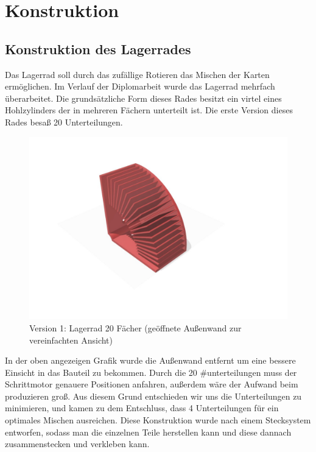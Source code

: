 \pagebreak
\section{Konstruktion}
\subsection{Konstruktion des Lagerrades}
Das Lagerrad soll durch das zufällige Rotieren das Mischen der Karten ermöglichen. Im Verlauf der Diplomarbeit wurde das Lagerrad mehrfach überarbeitet.
Die grundsätzliche Form dieses Rades besitzt ein virtel eines Hohlzylinders der in mehreren Fächern unterteilt ist. Die erste Version dieses Rades besaß 20 Unterteilungen.

\begin{figure}[H]
    \centering
    \includegraphics[scale=0.5,page=1]{fig/mech/LagerRad20F}
    \caption{Version 1: Lagerrad 20 Fächer (geöffnete Außenwand zur vereinfachten Ansicht)}
\end{figure}

In der oben angezeigen Grafik wurde die Außenwand entfernt um eine bessere Einsicht in das Bauteil zu bekommen.
Durch die 20 #unterteilungen muss der Schrittmotor genauere Positionen anfahren, außerdem wäre der Aufwand beim produzieren groß. Aus diesem Grund
entschieden wir uns die Unterteilungen zu minimieren, und kamen zu dem Entschluss, dass 4 Unterteilungen für ein optimales Mischen ausreichen. Diese Konstruktion
wurde nach einem Stecksystem entworfen, sodass man die einzelnen Teile herstellen kann und diese dannach zusammenstecken und verkleben kann.

